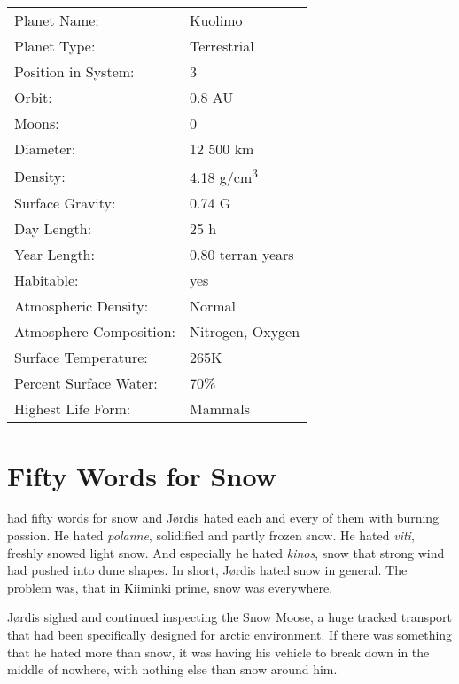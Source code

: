 \documentclass{tufte-book}
\begin{document}
\bigskip
\begin{minipage}{\textwidth}
\begin{center}
\begin{tabular}{ll}
\toprule
Planet Name: & Kuolimo \\
Planet Type: & Terrestrial \\
Position in System: & 3 \\
Orbit: & 0.8 AU \\
Moons: & 0 \\
Diameter: & 12 500 km \\
Density: & 4.18 g/cm\textsuperscript{3} \\
Surface Gravity: & 0.74 G \\
Day Length: & 25 h \\
Year Length: & 0.80 terran years \\
Habitable: & yes \\
\quad Atmospheric Density: & Normal \\
\quad Atmosphere Composition: & Nitrogen, Oxygen \\
\quad Surface Temperature: & 265K \\
\quad Percent Surface Water: & 70\% \\
\quad Highest Life Form: & Mammals \\

\bottomrule
\end{tabular}
\end{center}
\end{minipage}

\clearpage

\chapter{Fifty Words for Snow}

 had fifty words for snow and
J\o rdis hated each and every of them with burning passion. He hated
\emph{polanne}, solidified and partly frozen snow. He hated \emph{viti}, 
freshly snowed light snow. And especially he hated \emph{kinos}, snow 
that strong wind had pushed into dune shapes. In short, J\o rdis hated 
snow in general. The problem was, that in Kiiminki prime, snow was 
everywhere.

J\o rdis sighed and continued inspecting the Snow Moose, a huge
tracked transport that had been specifically designed for arctic
environment. If there was something that he hated more than snow, it
was having his vehicle to break down in the middle of nowhere, with
nothing else than snow around him.
\end{document}
